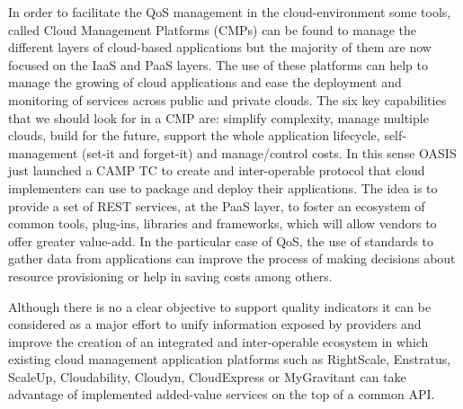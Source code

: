 In order to facilitate the QoS management in the cloud-environment some tools, called Cloud Management Platforms (CMPs) can be found 
to manage the different layers of cloud-based applications but the majority of them are now focused on the IaaS and PaaS layers. 
The use of these platforms can help to manage the growing of cloud applications and ease the deployment and monitoring of services across 
public and private clouds. The six key capabilities~\cite{Kephart2012} that we should look for in a CMP are: simplify complexity, 
manage multiple clouds, build for the future, support the whole application lifecycle, self-management (set-it and forget-it) and manage/control costs. 
In this sense OASIS just launched a CAMP TC to create and inter-operable protocol that cloud 
implementers can use to package and deploy their applications. The idea is to provide a set of REST services, at the PaaS layer, to foster an ecosystem of 
common tools, plug-ins, libraries and frameworks, which will allow vendors to offer greater value-add. In the particular case of QoS, the use of standards to gather data 
from applications can improve the process of making decisions about resource provisioning or help in saving costs among others.


Although there is no a clear objective to support quality indicators it can be considered as a major effort to unify information exposed by providers and 
improve the creation of an integrated and inter-operable ecosystem in which existing cloud management application platforms such 
as RightScale, Enstratus, ScaleUp, Cloudability, Cloudyn, CloudExpress or MyGravitant can take advantage of implemented 
added-value services on the top of a common API. 


